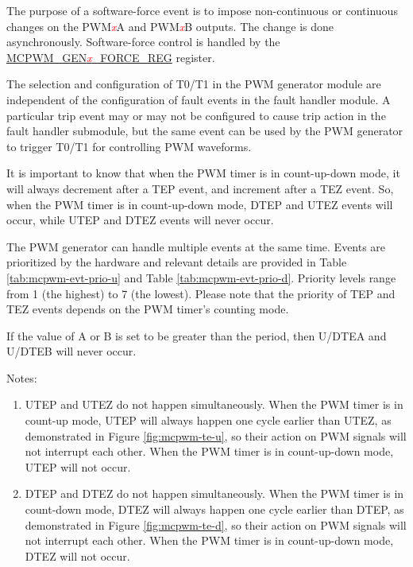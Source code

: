 \documentclass[main\_\_EN.tex]{subfiles}
\begin{document}
The purpose of a software-force event is to impose non-continuous or continuous changes on the PWM\textcolor{red}{\it{x}}A and PWM\textcolor{red}{\it{x}}B outputs. The change is done asynchronously. Software-force control is handled by the\\ \hyperref[regdesc:MCPWMGEN0FORCEREG]{MCPWM\_GEN\textcolor{red}{\it{x}}\_FORCE\_REG} register.

The selection and configuration of T0/T1 in the PWM generator module are independent of the configuration of fault events in the fault handler module. A particular trip event may or may not be configured to cause trip action in the fault handler submodule, but the same event can be used by the PWM generator to trigger T0/T1 for controlling PWM waveforms.

It is important to know that when the PWM timer is in count-up-down mode, it will always decrement after a TEP event, and increment after a TEZ event. So, when the PWM timer is in count-up-down mode, DTEP and UTEZ events will occur, while UTEP and DTEZ events will never occur.

The PWM generator can handle multiple events at the same time. Events are prioritized by the hardware and relevant details are provided in Table \ref{tab:mcpwm-evt-prio-u} and Table \ref{tab:mcpwm-evt-prio-d}. Priority levels range from 1 (the highest) to 7 (the lowest). Please note that the priority of TEP and TEZ events depends on the PWM timer's counting mode.

If the value of A or B is set to be greater than the period, then U/DTEA and U/DTEB will never occur.




Notes:
\begin{enumerate}
   \item UTEP and UTEZ do not happen simultaneously. When the PWM timer is in count-up mode, UTEP will always happen one cycle earlier than UTEZ, as demonstrated in Figure \ref{fig:mcpwm-te-u}, so their action on PWM signals will not interrupt each other. When the PWM timer is in count-up-down mode, UTEP will not occur.
    \item DTEP and DTEZ do not happen simultaneously. When the PWM timer is in count-down mode, DTEZ will always happen one cycle earlier than DTEP, as demonstrated in Figure \ref{fig:mcpwm-te-d}, so their action on PWM signals will not interrupt each other. When the PWM timer is in count-up-down mode, DTEZ will not occur. 
\end{enumerate}
\end{document}

